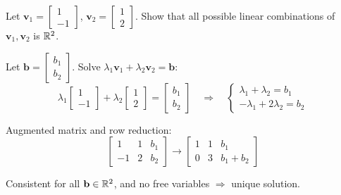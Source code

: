 \begin{example}
  Let $\mathbf{v}_1 =
    \begin{bmatrix}
      1 \\ -1
    \end{bmatrix}
  $,
  $\mathbf{v}_2 =
    \begin{bmatrix}
      1 \\ 2
    \end{bmatrix}
  $.
  Show that all possible linear combinations of $\mathbf{v}_1, \mathbf{v}_2$ is $\mathbb{R}^2$.

  \begin{center}
  \end{center}

  Let $\mathbf{b} =
    \begin{bmatrix}
      b_1 \\ b_2
    \end{bmatrix}
  $. Solve $\lambda_1 \mathbf{v}_1 + \lambda_2 \mathbf{v}_2 = \mathbf{b}$:
  \[
    \lambda_1
    \begin{bmatrix}
      1 \\ -1
    \end{bmatrix}
    + \lambda_2
    \begin{bmatrix}
      1 \\ 2
    \end{bmatrix}
    =
    \begin{bmatrix}
      b_1 \\ b_2
    \end{bmatrix}
    \quad \Longrightarrow \quad
    \begin{cases}
      \lambda_1 + \lambda_2 = b_1 \\
      -\lambda_1 + 2\lambda_2 = b_2
    \end{cases}
  \]

  Augmented matrix and row reduction:
  \[
    \left[
      \begin{array}{cc|c}
        1  & 1 & b_1 \\
        -1 & 2 & b_2
      \end{array}
      \right]
    \longrightarrow
    \left[
      \begin{array}{cc|c}
        1 & 1 & b_1       \\
        0 & 3 & b_1 + b_2
      \end{array}
      \right]
  \]

  Consistent for all $\mathbf{b} \in \mathbb{R}^2$, and no free variables $\Longrightarrow$ unique solution.
\end{example}

